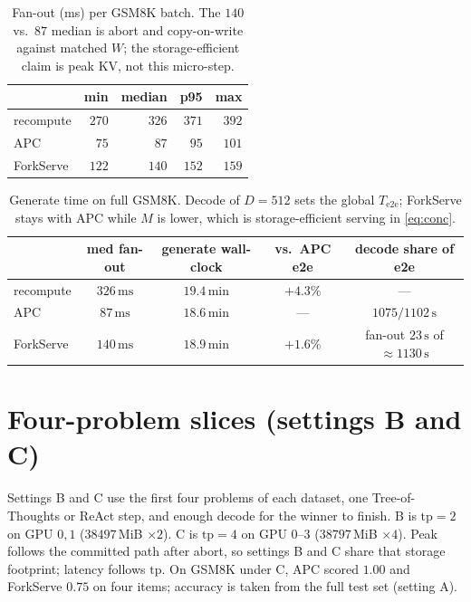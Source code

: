 \documentclass[11pt,a4paper]{article}
\begin{document}
\begin{table}[h]
\centering
\small
\begin{tabular}{@{}lrrrr@{}}
\toprule
 & min & median & p95 & max \\
\midrule
recompute & $270$ & $326$ & $371$ & $392$ \\
APC & $75$ & $87$ & $95$ & $101$ \\
ForkServe & $122$ & $140$ & $152$ & $159$ \\
\bottomrule
\end{tabular}
\caption{Fan-out (ms) per GSM8K batch.
The $140$ vs.\ $87$ median is abort and copy-on-write against matched $W$; the storage-efficient claim is peak KV, not this micro-step.}
\end{table}

\begin{table}[h]
\centering
\small
\begin{tabular}{@{}lcccc@{}}
\toprule
 & med fan-out & generate wall-clock & vs.\ APC e2e & decode share of e2e \\
\midrule
recompute & $326\,\mathrm{ms}$ & $19.4\,\mathrm{min}$ & $+4.3\%$ & --- \\
APC & $87\,\mathrm{ms}$ & $18.6\,\mathrm{min}$ & --- & $1075/1102\,\mathrm{s}$ \\
ForkServe & $140\,\mathrm{ms}$ & $18.9\,\mathrm{min}$ & $+1.6\%$ & fan-out $23\,\mathrm{s}$ of $\approx 1130\,\mathrm{s}$ \\
\bottomrule
\end{tabular}
\caption{Generate time on full GSM8K.
Decode of $D{=}512$ sets the global $T_{\mathrm{e2e}}$; ForkServe stays with APC while $M$ is lower, which is storage-efficient serving in \eqref{eq:conc}.}
\end{table}

\section{Four-problem slices (settings B and C)}

Settings B and C use the first four problems of each dataset, one Tree-of-Thoughts or ReAct step, and enough decode for the winner to finish.
B is $\mathrm{tp}{=}2$ on GPU $0,1$ ($38497$\,MiB $\times 2$).
C is $\mathrm{tp}{=}4$ on GPU $0$--$3$ ($38797$\,MiB $\times 4$).
Peak follows the committed path after abort, so settings B and C share that storage footprint; latency follows $\mathrm{tp}$.
On GSM8K under C, APC scored $1.00$ and ForkServe $0.75$ on four items; accuracy is taken from the full test set (setting A).
\end{document}
